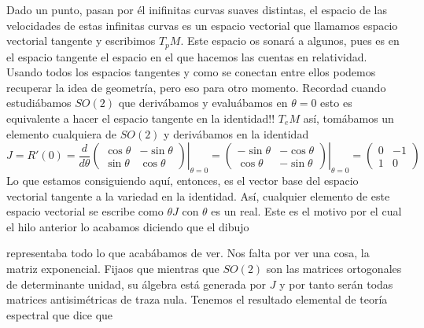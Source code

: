 \documentclass[12pt]{article}
\begin{document}
Dado un punto, pasan por él inifinitas curvas suaves distintas, el espacio de las velocidades de estas infinitas curvas es un espacio vectorial que llamamos espacio vectorial tangente y escribimos $T_p M$. Este espacio os sonará a algunos, pues es en el espacio tangente el espacio en el que hacemos las cuentas en relatividad. Usando todos los espacios tangentes y como se conectan entre ellos podemos recuperar la idea de geometría, pero eso para otro momento. Recordad cuando estudiábamos $SO(2)$ que derivábamos y evaluábamos en $\theta =0$ esto es equivalente a hacer el espacio tangente en la identidad!! $T_e M$ así, tomábamos un elemento cualquiera de $SO(2)$ y derivábamos en la identidad
\begin{equation*}
    J=R' (0) = \left. \frac{d}{d\theta}\begin{pmatrix}
        \cos \theta & -\sin\theta \\ \sin\theta & \cos\theta 
    \end{pmatrix}\right|_{\theta =0 } =\left. \begin{pmatrix}
        -\sin\theta & -\cos \theta \\ \cos \theta &-\sin\theta 
    \end{pmatrix} \right|_{\theta=0} =\begin{pmatrix}
        0 & -1 \\ 1 & 0
    \end{pmatrix}
\end{equation*}
Lo que estamos consiguiendo aquí, entonces, es el vector base del espacio vectorial tangente a la variedad en la identidad. Así, cualquier elemento de este espacio vectorial se escribe como $\theta J$ con $\theta$ es un real. Este es el motivo por el cual el hilo anterior lo acabamos diciendo que el dibujo
\begin{center}
\end{center} 
representaba todo lo que acabábamos de ver. Nos falta por ver una cosa, la matriz exponencial. Fijaos que mientras que $SO(2)$ son las matrices ortogonales de determinante unidad, su álgebra está generada por $J$ y por tanto serán todas matrices antisimétricas de traza nula. Tenemos el resultado elemental de teoría espectral que dice que
\end{document}
